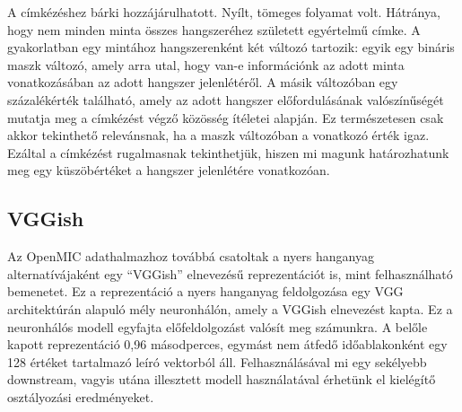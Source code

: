A címkézéshez bárki hozzájárulhatott. Nyílt, tömeges folyamat volt. Hátránya, hogy nem minden minta összes hangszeréhez született egyértelmű címke. A gyakorlatban egy mintához hangszerenként két változó tartozik: egyik egy bináris maszk változó, amely arra utal, hogy van-e információnk az adott minta vonatkozásában az adott hangszer jelenlétéről. A másik változóban egy százalékérték található, amely az adott hangszer előfordulásának valószínűségét mutatja meg a címkézést végző közösség ítéletei alapján. Ez természetesen csak akkor tekinthető relevánsnak, ha a maszk változóban a vonatkozó érték igaz. Ezáltal a címkézést rugalmasnak tekinthetjük, hiszen mi magunk határozhatunk meg egy küszöbértéket a hangszer jelenlétére vonatkozóan. \cite{humphrey2018openmic}

\subsection{VGGish}
\label{subsec:VGGish}

Az OpenMIC adathalmazhoz továbbá csatoltak a nyers hanganyag alternatívájaként egy “VGGish” elnevezésű reprezentációt is, mint felhasználható bemenetet. Ez a reprezentáció a nyers hanganyag feldolgozása egy VGG \cite{vgg} architektúrán alapuló mély neuronhálón, amely a VGGish elnevezést kapta. Ez a neuronhálós modell egyfajta előfeldolgozást valósít meg számunkra. A belőle kapott reprezentáció 0,96 másodperces, egymást nem átfedő időablakonként egy 128 értéket tartalmazó leíró vektorból áll. Felhasználásával mi egy sekélyebb downstream, vagyis utána illesztett modell használatával érhetünk el kielégítő osztályozási eredményeket. \cite{vggish}